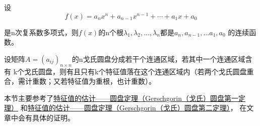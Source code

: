 \documentclass[lang=cn,10pt]{elegantbook}
\begin{document}
\begin{lemma}
	设\begin{equation*}
		f(x)=a_nx^n+a_{n-1}x^{n-1}+\cdots+a_1x+a_0
	\end{equation*}
	\par 是n次复系数多项式，则$f(x)$的n个根$\lambda_{1},\lambda_{2},\ldots,\lambda_{n}$都是$a_n,a_{n-1},\ldots a_1,a_0$
	的连续函数。
\end{lemma}

\begin{theorem}[圆盘第二定理]
	设矩阵$A=(a_{ij})_{n \times n}$的n戈氏圆盘分成若干个连通区域，若其中一个连通区域含有
	k个戈氏圆盘，则有且只有k个特征值落在这个连通区域内（若两个戈氏圆盘重合，需计重数；又若特征值为重根，也计重数）。
\end{theorem}

本节主要参考了\href{https://zhuanlan.zhihu.com/p/418915975}{特征值的估计——圆盘定理（Gerschgorin（戈氏）圆盘第一定理）}
和\href{https://zhuanlan.zhihu.com/p/419195345}{特征值的估计——圆盘定理（Gerschgorin（戈氏）圆盘第二定理）}，
在文章中会有具体的证明。
\end{document}
